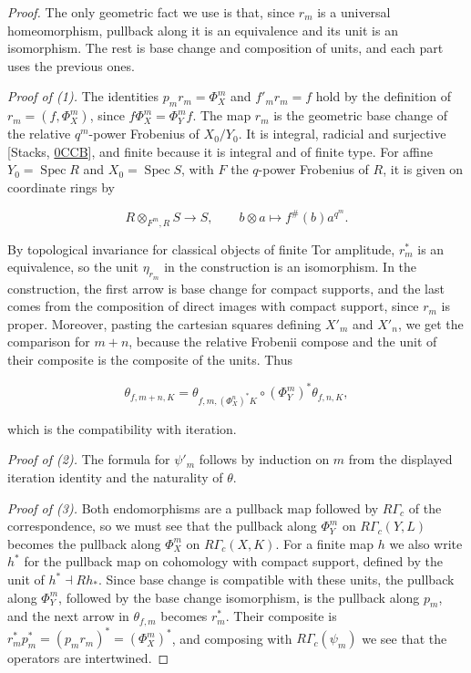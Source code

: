 \documentclass[11pt]{article}
\begin{document}
\begin{proof}[{Proof}]\label{bp56}%
The only geometric fact we use is that, since \(r_m\) is a universal homeomorphism, pullback along it is an equivalence and its unit is an isomorphism. The rest is base change and composition of units, and each part uses the previous ones.

\emph{Proof of (1).} The identities \(p_mr_m=\Phi_X^m\) and \(f'_mr_m=f\) hold by the definition of \(r_m=(f,\Phi_X^m)\), since \(f\Phi_X^m=\Phi_Y^mf\). The map \(r_m\) is the geometric base change of the relative \(q^m\)-power Frobenius of \(X_0/Y_0\). It is integral, radicial and surjective [Stacks, \href{https://stacks.math.columbia.edu/tag/0CCB}{0CCB}], and finite because it is integral and of finite type. For affine \(Y_0=\operatorname{Spec}R\) and \(X_0=\operatorname{Spec}S\), with \(F\) the \(q\)-power Frobenius of \(R\), it is given on coordinate rings by

\[
R\otimes_{F^m,R}S\longrightarrow S,
\qquad b\otimes a\longmapsto f^\#(b)a^{q^m}.
\]

By topological invariance for classical objects of finite Tor amplitude, \(r_m^*\) is an equivalence, so the unit \(\eta_{r_m}\) in the construction is an isomorphism. In the construction, the first arrow is base change for compact supports, and the last comes from the composition of direct images with compact support, since \(r_m\) is proper. Moreover, pasting the cartesian squares defining \(X'_m\) and \(X'_n\), we get the comparison for \(m+n\), because the relative Frobenii compose and the unit of their composite is the composite of the units. Thus

\[
\theta_{f,m+n,K}=
\theta_{f,m,(\Phi_X^n)^*K}\circ
(\Phi_Y^m)^*\theta_{f,n,K},
\]

which is the compatibility with iteration.

\emph{Proof of (2).} The formula for \(\psi'_m\) follows by induction on \(m\) from the displayed iteration identity and the naturality of \(\theta\).

\emph{Proof of (3).} Both endomorphisms are a pullback map followed by \(R\Gamma_c\) of the correspondence, so we must see that the pullback along \(\Phi_Y^m\) on \(R\Gamma_c(Y,L)\) becomes the pullback along \(\Phi_X^m\) on \(R\Gamma_c(X,K)\). For a finite map \(h\) we also write \(h^*\) for the pullback map on cohomology with compact support, defined by the unit of \(h^*\dashv Rh_*\). Since base change is compatible with these units, the pullback along \(\Phi_Y^m\), followed by the base change isomorphism, is the pullback along \(p_m\), and the next arrow in \(\theta_{f,m}\) becomes \(r_m^*\). Their composite is \(r_m^*p_m^*=(p_mr_m)^*=(\Phi_X^m)^*\), and composing with \(R\Gamma_c(\psi_m)\) we see that the operators are intertwined.


\end{proof}
\end{document}
